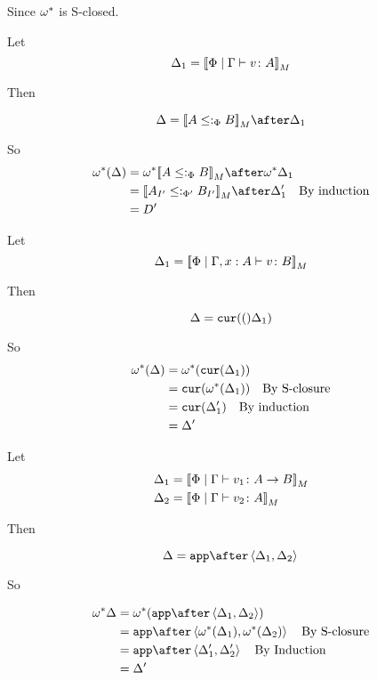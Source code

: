 \documentclass{report}
\begin{document}
Since $\omega^*$ is S-closed.


Let \begin{equation}
    \Delta_1 = {\bf [\![}\Phi\mid\Gamma \vdash v \colon A{\bf ]\!]}_M
\end{equation}

Then

\begin{equation}
    \D = \deno{A\subtypep B}\after \D_1\\
\end{equation}

So 
\begin{align}
    \w\star(\D) & = \w\star{\deno{A\subtypep B}}\after\w\star\D_1 \\
    & = \deno{A_{I'}\subtypepp B_{I'}}\after\D_1'\qt{By induction}\\
    & = D'
\end{align}

Let \begin{equation}
    \Delta_1 = {\bf [\![}\Phi\mid\Gamma, x: A \vdash v \colon B{\bf ]\!]}_M
\end{equation}

Then

\begin{equation}
    \Delta = \texttt{cur}(()\Delta_1)\\
\end{equation}

So
\begin{align}
    \omega^*(\Delta) & = \omega^*(\texttt{cur}(\Delta_1))\\
    & = \texttt{cur}(\omega^*(\Delta_1))\quad\text{By S-closure}\\
    & = \texttt{cur}(\Delta_1')\quad\text{By induction}\\
    & = \Delta'
\end{align}

Let \begin{align}
    \Delta_1 &= {\bf [\![}\Phi\mid\Gamma \vdash v_1 \colon A\rightarrow B{\bf ]\!]}_M\\
    \Delta_2 &= {\bf [\![}\Phi\mid\Gamma \vdash v_2 \colon A{\bf ]\!]}_M
\end{align}

Then

\begin{equation}
    \D = \app\after\pr{\D_1}{\D_2}\\
\end{equation}

So

\begin{align}
    \w\star\D & = \w\star(\app\after\pr{\D_1}{\D_2})\\
    & = \app\after\pr{\w\star(\D_1)}{\w\star(\D_2)}\qt{By S-closure}\\
    & = \app\after\pr{\D_1'}{\D_2'}\qt{By Induction}\\
    & = \D'
\end{align}
\end{document}
